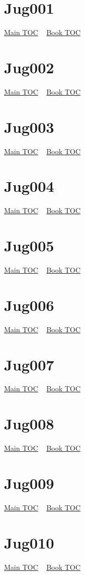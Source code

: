 \documentclass{book}
\begin{document}
  \section{Jug001}\hyperlink{toc}{Main TOC} ~ \hyperref[subsec:Jug]{Book TOC} 
  \section{Jug002}\hyperlink{toc}{Main TOC} ~ \hyperref[subsec:Jug]{Book TOC} 
  \section{Jug003}\hyperlink{toc}{Main TOC} ~ \hyperref[subsec:Jug]{Book TOC} 
  \section{Jug004}\hyperlink{toc}{Main TOC} ~ \hyperref[subsec:Jug]{Book TOC} 
  \section{Jug005}\hyperlink{toc}{Main TOC} ~ \hyperref[subsec:Jug]{Book TOC} 
  \section{Jug006}\hyperlink{toc}{Main TOC} ~ \hyperref[subsec:Jug]{Book TOC} 
  \section{Jug007}\hyperlink{toc}{Main TOC} ~ \hyperref[subsec:Jug]{Book TOC} 
  \section{Jug008}\hyperlink{toc}{Main TOC} ~ \hyperref[subsec:Jug]{Book TOC} 
  \section{Jug009}\hyperlink{toc}{Main TOC} ~ \hyperref[subsec:Jug]{Book TOC} 
  \section{Jug010}\hyperlink{toc}{Main TOC} ~ \hyperref[subsec:Jug]{Book TOC} 
\end{document}
